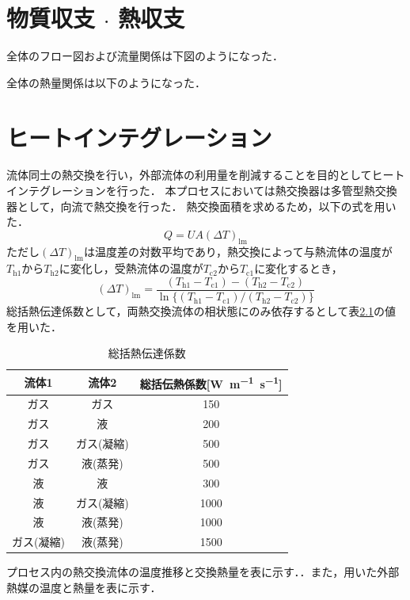 \documentclass[a4j]{jsreport}
\begin{document}
\newpage
\chapter{物質収支 $\cdot$ 熱収支}
全体のフロー図および流量関係は下図のようになった．

全体の熱量関係は以下のようになった．

\newpage
\chapter{ヒートインテグレーション}
流体同士の熱交換を行い，外部流体の利用量を削減することを目的としてヒートインテグレーションを行った．
本プロセスにおいては熱交換器は多管型熱交換器として，向流で熱交換を行った．
熱交換面積を求めるため，以下の式を用いた．
\begin{equation}
    Q=UA(\Delta T)_\mathrm{lm}
\end{equation}
ただし$(\Delta T)_\mathrm{lm}$は温度差の対数平均であり，熱交換によって与熱流体の温度が$T_\mathrm{h1}$から$T_\mathrm{h2}$に変化し，受熱流体の温度が$T_\mathrm{c2}$から$T_\mathrm{c1}$に変化するとき，
\begin{equation}
    (\Delta T)_\mathrm{lm} = \frac{(T_\mathrm{h1} - T_\mathrm{c1}) - (T_\mathrm{h2} - T_\mathrm{c2})}{\ln\{(T_\mathrm{h1} - T_\mathrm{c1}) / (T_\mathrm{h2} - T_\mathrm{c2})\}}
\end{equation}
総括熱伝達係数として，両熱交換流体の相状態にのみ依存するとして表\ref{総括熱伝達係数}の値を用いた．
\begin{table}[htbp]
    \caption{総括熱伝達係数}
    \label{総括熱伝達係数}
    \begin{center}
        \begin{tabular}{ccc}\hline
            流体1        &  流体2       & 総括伝熱係数[\si{\watt\metre^{-1}\second^{-1}}]    \\   \hline
            ガス         &  ガス        &150   \\
            ガス         &   液        &200   \\
            ガス         &  ガス(凝縮)  &500    \\
            ガス         &  液(蒸発)    &500    \\
            液           &   液          &300   \\
            液           &  ガス(凝縮)  &1000    \\
            液           &  液(蒸発)    &1000    \\
            ガス(凝縮)    &  液(蒸発)  &1500       \\\hline
        \end{tabular}
    \end{center}
\end{table}
プロセス内の熱交換流体の温度推移と交換熱量を表に示す．．また，用いた外部熱媒の温度と熱量を表に示す．
\end{document}
